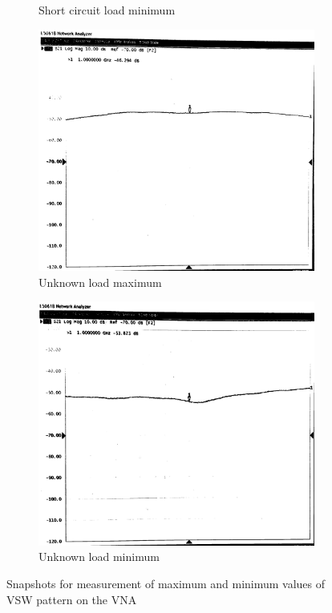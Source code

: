 \documentclass[10pt]{article}
\begin{document}
\begin{figure}
\begin{subfigure}[b]{0.45\textwidth}
      \caption{Short circuit load minimum}
  \end{subfigure}
  \begin{subfigure}[b]{0.45\textwidth}
      \includegraphics[width=\textwidth]{../photos/lab2/unkwn-load-peak.jpg}
      \caption{Unknown load maximum}
  \end{subfigure}
  \quad
  \begin{subfigure}[b]{0.45\textwidth}
      \includegraphics[width=\textwidth]{../photos/lab2/unkwn-load-valley.jpg}
      \caption{Unknown load minimum}
  \end{subfigure}
  \caption{Snapshots for measurement of maximum and minimum values of VSW pattern on the VNA \vspace{-0.5cm}}
  \label{v_t_matched_tline}
\end{figure}
\end{document}

